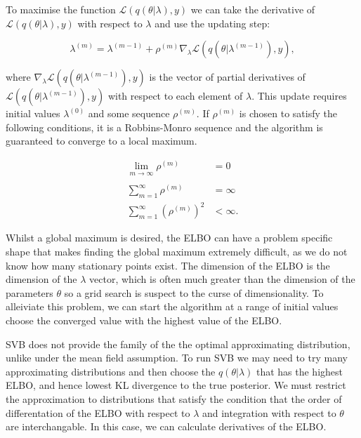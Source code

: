 \documentclass{article}\usepackage[]{graphicx}\usepackage[]{color}
\numberwithin{equation}{section}
\begin{document}
To maximise the function $\mathcal{L}(q(\theta | \lambda), y)$ we can take the derivative of $\mathcal{L}(q(\theta | \lambda), y)$ with respect to $\lambda$ and use the updating step:

\begin{equation}
\label{SGA1}
\lambda^{(m)} = \lambda^{(m-1)} + \rho^{(m)} \nabla_{\lambda} \mathcal{L}(q(\theta | \lambda^{(m-1)}), y),
\end{equation}

where $\nabla_{\lambda}\mathcal{L}(q(\theta | \lambda^{(m-1)}), y)$ is the vector of partial derivatives of $\mathcal{L}(q(\theta | \lambda^{(m-1)}), y)$ with respect to each element of $\lambda$. This update requires initial values $\lambda^{(0)}$ and some sequence $\rho^{(m)}$. If $\rho^{(m)}$ is chosen to satisfy the following conditions, it is a Robbins-Monro sequence and the algorithm is guaranteed to converge to a local maximum.

\begin{align}
\lim_{m \xrightarrow[]{} \infty} \rho^{(m)} &= 0 \nonumber \\
\sum_{m=1}^{\infty} \rho^{(m)} &=  \infty \nonumber \\
\sum_{m=1}^{\infty} (\rho^{(m)})^2 &<  \infty. \nonumber
\end{align}

Whilst a global maximum is desired, the ELBO can have a problem specific shape that makes finding the global maximum extremely difficult, as we do not know how many stationary points exist. The dimension of the ELBO is the dimension of the $\lambda$ vector, which is often much greater than the dimension of the parameters $\theta$ so a grid search is suspect to the curse of dimensionality. To alleiviate this problem, we can start the algorithm at a range of initial values choose the converged value with the highest value of the ELBO. 

SVB does not provide the family of the the optimal approximating distribution, unlike under the mean field assumption. To run SVB we may need to try many approximating distributions and then choose the $q(\theta | \lambda)$ that has the highest ELBO, and hence lowest KL divergence to the true posterior. We must restrict the approximation to distributions that satisfy the condition that the order of differentation of the ELBO with respect to $\lambda$ and integration with respect to $\theta$ are interchangable. In this case, we can calculate derivatives of the ELBO.
\end{document}
